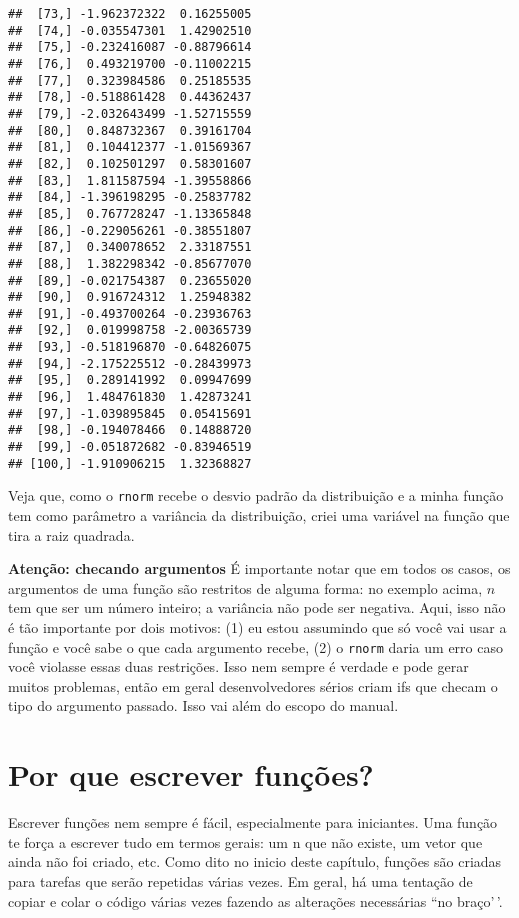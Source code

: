 \documentclass[
]{book}
\begin{document}
\begin{verbatim}
##  [73,] -1.962372322  0.16255005
##  [74,] -0.035547301  1.42902510
##  [75,] -0.232416087 -0.88796614
##  [76,]  0.493219700 -0.11002215
##  [77,]  0.323984586  0.25185535
##  [78,] -0.518861428  0.44362437
##  [79,] -2.032643499 -1.52715559
##  [80,]  0.848732367  0.39161704
##  [81,]  0.104412377 -1.01569367
##  [82,]  0.102501297  0.58301607
##  [83,]  1.811587594 -1.39558866
##  [84,] -1.396198295 -0.25837782
##  [85,]  0.767728247 -1.13365848
##  [86,] -0.229056261 -0.38551807
##  [87,]  0.340078652  2.33187551
##  [88,]  1.382298342 -0.85677070
##  [89,] -0.021754387  0.23655020
##  [90,]  0.916724312  1.25948382
##  [91,] -0.493700264 -0.23936763
##  [92,]  0.019998758 -2.00365739
##  [93,] -0.518196870 -0.64826075
##  [94,] -2.175225512 -0.28439973
##  [95,]  0.289141992  0.09947699
##  [96,]  1.484761830  1.42873241
##  [97,] -1.039895845  0.05415691
##  [98,] -0.194078466  0.14888720
##  [99,] -0.051872682 -0.83946519
## [100,] -1.910906215  1.32368827
\end{verbatim}

Veja que, como o \texttt{rnorm} recebe o desvio padrão da distribuição e a minha função tem como parâmetro a variância da distribuição, criei uma variável na função que tira a raiz quadrada.

\textbf{Atenção: checando argumentos}
É importante notar que em todos os casos, os argumentos de uma função são restritos de alguma forma: no exemplo acima, \(n\) tem que ser um número inteiro; a variância não pode ser negativa. Aqui, isso não é tão importante por dois motivos: (1) eu estou assumindo que só você vai usar a função e você sabe o que cada argumento recebe, (2) o \texttt{rnorm} daria um erro caso você violasse essas duas restrições. Isso nem sempre é verdade e pode gerar muitos problemas, então em geral desenvolvedores sérios criam ifs que checam o tipo do argumento passado. Isso vai além do escopo do manual.

\hypertarget{por-que-escrever-funuxe7uxf5es}{%
\section{Por que escrever funções?}\label{por-que-escrever-funuxe7uxf5es}}

Escrever funções nem sempre é fácil, especialmente para iniciantes. Uma função te força a escrever tudo em termos gerais: um n que não existe, um vetor que ainda não foi criado, etc. Como dito no inicio deste capítulo, funções são criadas para tarefas que serão repetidas várias vezes. Em geral, há uma tentação de copiar e colar o código várias vezes fazendo as alterações necessárias ``no braço'\,'.
\end{document}
